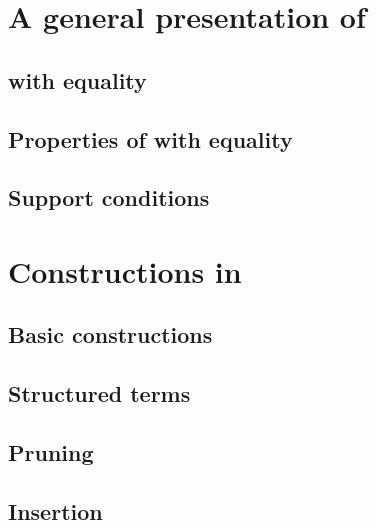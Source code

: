 \documentclass{cam-thesis}
\begin{document}



\chapter{A general presentation of \Catt}
\label{cha:gener-pres-catt}


\section{\Catt with equality}
\label{sec:catt-with-equality}

\section{Properties of \Catt with equality}
\label{sec:properties-catt-with}

\section{Support conditions}
\label{sec:support-conditions}


\chapter{Constructions in \Catt}
\label{sec:operations-catt}

\section{Basic constructions}
\label{sec:basic-constructions}

\section{Structured terms}
\label{sec:structured-terms}

\section{Pruning}
\label{sec:pruning}

\section{Insertion}
\label{sec:insertion}
\end{document}
